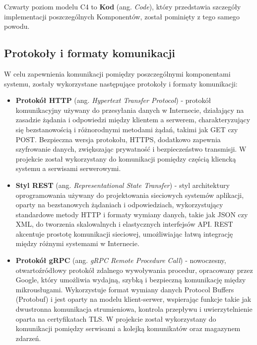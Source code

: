 Czwarty poziom modelu C4 to \textbf{Kod} (ang. \textit{Code}), który przedstawia szczegóły implementacji poszczególnych Komponentów, został pominięty z tego samego powodu.


\subsection{Protokoły i formaty komunikacji}

W celu zapewnienia komunikacji pomiędzy poszczególnymi komponentami systemu, zostały wykorzystane następujące protokoły i formaty komunikacji:

\begin{itemize}

    \item \textbf{Protokół HTTP} (ang. \textit{Hypertext Transfer Protocol}) - protokół komunikacyjny używany do przesyłania danych w Internecie, działający na zasadzie żądania i odpowiedzi między klientem a serwerem, charakteryzujący się bezstanowością i różnorodnymi metodami żądań, takimi jak GET czy POST. Bezpieczna wersja protokołu, HTTPS, dodatkowo zapewnia szyfrowanie danych, zwiększając prywatność i bezpieczeństwo transmisji. W projekcie został wykorzystany do komunikacji pomiędzy częścią kliencką systemu a serwisami serwerowymi.

    \item \textbf{Styl REST} (ang. \textit{Representational State Transfer}) - styl architektury oprogramowania używany do projektowania sieciowych systemów aplikacji, oparty na bezstanowych żądaniach i odpowiedziach, wykorzystujący standardowe metody HTTP i formaty wymiany danych, takie jak JSON czy XML, do tworzenia skalowalnych i elastycznych interfejsów API. REST akcentuje prostotę komunikacji sieciowej, umożliwiając łatwą integrację między różnymi systemami w Internecie.
    
    \item \textbf{Protokół gRPC} (ang. \textit{gRPC Remote Procedure Call}) - nowoczesny, otwartoźródłowy protokół zdalnego wywoływania procedur, opracowany przez Google, który umożliwia wydajną, szybką i bezpieczną komunikację między mikrousługami. Wykorzystuje format wymiany danych Protocol Buffers (Protobuf) i jest oparty na modelu klient-serwer, wspierając funkcje takie jak dwustronna komunikacja strumieniowa, kontrola przepływu i uwierzytelnienie oparta na certyfikatach TLS. W projekcie został wykorzystany do komunikacji pomiędzy serwisami a kolejką komunikatów oraz magazynem zdarzeń.


\end{itemize}

